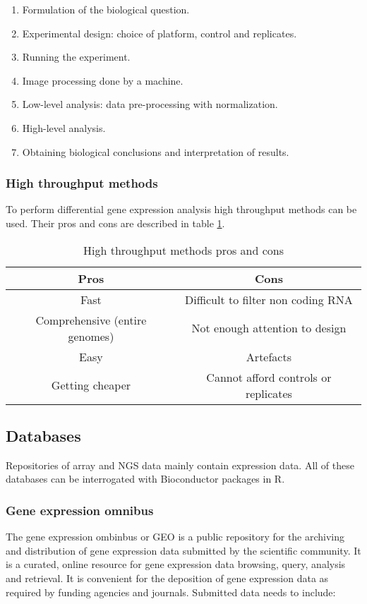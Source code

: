 		\begin{multicols}{2}
			\begin{enumerate}
				\item Formulation of the biological question.
				\item Experimental design: choice of platform, control and replicates.
				\item Running the experiment.
				\item Image processing done by a machine.
				\item Low-level analysis: data pre-processing with normalization.
				\item High-level analysis.
				\item Obtaining biological conclusions and interpretation of results.
			\end{enumerate}
		\end{multicols}

		\subsubsection{High throughput methods}
		To perform differential gene expression analysis high throughput methods can be used.
		Their pros and cons are described in table \ref{tab:high-through-dge}.

		\begin{table}[H]
			\centering
			\begin{tabular}{|c|c|}
				\hline
				Pros & Cons\\
				\hline
				Fast & Difficult to filter non coding RNA\\
				Comprehensive (entire genomes) & Not enough attention to design\\
				Easy & Artefacts\\
				Getting cheaper & Cannot afford controls or replicates\\
				\hline
			\end{tabular}
			\caption{High throughput methods pros and cons}
			\label{tab:high-through-dge}
		\end{table}

	\subsection{Databases}
	Repositories of array and NGS data mainly contain expression data.
	All of these databases can be interrogated with Bioconductor packages in R.

		\subsubsection{Gene expression omnibus}
		The gene expression ombinbus or GEO is a public repository for the archiving and distribution of gene expression data submitted by the scientific community.
		It is a curated, online resource for gene expression data browsing, query, analysis and retrieval.
		It is convenient for the deposition of gene expression data as required by funding agencies and journals.
		Submitted data needs to include:

